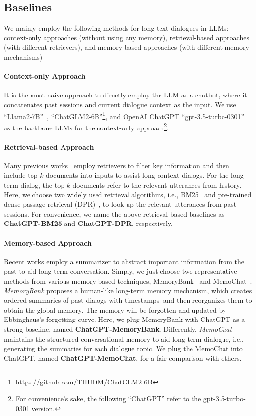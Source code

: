 \documentclass[authoryear,preprint,review,12pt]{elsarticle}
\begin{document}
\subsection{Baselines}
We mainly employ the following methods for long-text dialogues in LLMs: context-only approaches (without using any memory), retrieval-based approaches (with different retrievers), and memory-based approaches (with different memory mechanisms)
\paragraph*{Context-only Approach} It is the most naive approach to directly employ the LLM as a chatbot, where it concatenates past sessions and current dialogue context as the input. We use ``Llama2-7B''~\citep{llama2}, ``ChatGLM2-6B''\footnote{\url{https://github.com/THUDM/ChatGLM2-6B}}, and OpenAI ChatGPT ``gpt-3.5-turbo-0301'' as the backbone LLMs for the context-only approach\footnote{For convenience's sake, the following ``ChatGPT'' refer to the gpt-3.5-turbo-0301 version.}. 
\paragraph*{Retrieval-based Approach}
    Many previous works~\citep{xu-etal-2022-beyond} employ retrievers to filter key information and then include top-$k$ documents into inputs to assist long-context dialogs. For the long-term dialog, the top-$k$ documents refer to the relevant utterances from history. Here, we choose two widely used retrieval algorithms, i.e., BM25~\citep{robertson2009probabilistic} and pre-trained dense passage retrieval (DPR)~\citep{karpukhin-etal-2020-dense}, to look up the relevant utterances from past sessions. For convenience, we name the above retrieval-based baselines as \textbf{ChatGPT-BM25} and \textbf{ChatGPT-DPR}, respectively.
 \paragraph*{Memory-based Approach} Recent works employ a summarizer to abstract important information from the past to aid long-term conversation. Simply, we just choose two representative methods from various memory-based techniques, MemoryBank~\citep{Zhong2023MemoryBankEL} and MemoChat~\citep{Lu2023MemoChatTL}. \textit{MemoryBank} proposes a human-like long-term memory mechanism, which creates ordered summaries of past dialogs with timestamps, and then reorganizes them to obtain the global memory. The memory will be forgotten and updated by Ebbinghaus’s forgetting curve. Here, we plug MemoryBank with ChatGPT as a strong baseline, named \textbf{ChatGPT-MemoryBank}. Differently, \textit{MemoChat} maintains the structured conversational memory to aid long-term dialogue, i.e., generating the summaries for each dialogue topic. We plug the MemoChat into ChatGPT, named \textbf{ChatGPT-MemoChat}, for a fair comparison with others.
\end{document}
